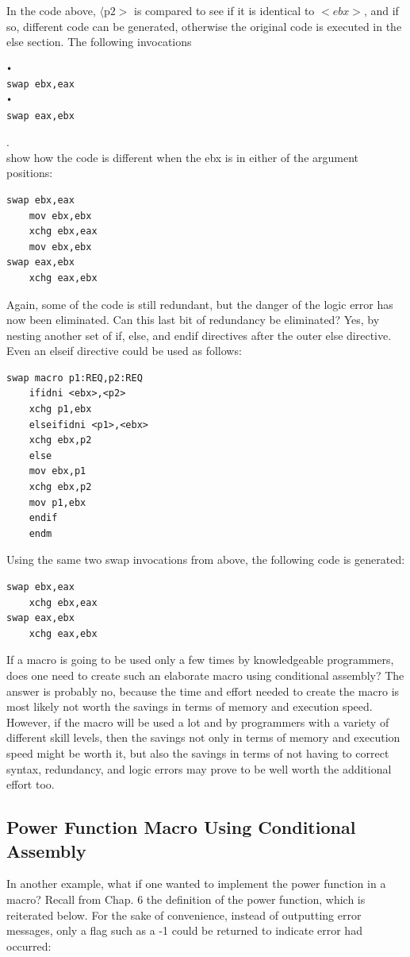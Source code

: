 \documentclass[10pt]{book}
\begin{document}
In the code above, $\langle\mathrm{p} 2>$ is compared to see if it is identical to $<e b x>$, and if so, different code can be generated, otherwise the original code is executed in the else section. The following invocations

\begin{verbatim}
•
swap ebx,eax
•
swap eax,ebx
\end{verbatim}

.\\
show how the code is different when the ebx is in either of the argument positions:

\begin{verbatim}
swap ebx,eax
    mov ebx,ebx
    xchg ebx,eax
    mov ebx,ebx
swap eax,ebx
    xchg eax,ebx
\end{verbatim}

Again, some of the code is still redundant, but the danger of the logic error has now been eliminated. Can this last bit of redundancy be eliminated? Yes, by nesting another set of if, else, and endif directives after the outer else directive. Even an elseif directive could be used as follows:

\begin{verbatim}
swap macro p1:REQ,p2:REQ
    ifidni <ebx>,<p2>
    xchg p1,ebx
    elseifidni <p1>,<ebx>
    xchg ebx,p2
    else
    mov ebx,p1
    xchg ebx,p2
    mov p1,ebx
    endif
    endm
\end{verbatim}

Using the same two swap invocations from above, the following code is generated:

\begin{verbatim}
swap ebx,eax
    xchg ebx,eax
swap eax,ebx
    xchg eax,ebx
\end{verbatim}

If a macro is going to be used only a few times by knowledgeable programmers, does one need to create such an elaborate macro using conditional assembly? The answer is probably no, because the time and effort needed to create the macro is most likely not worth the savings in terms of memory and execution speed. However, if the macro will be used a lot and by programmers with a variety of different skill levels, then the savings not only in terms of memory and execution speed might be worth it, but also the savings in terms of not having to correct syntax, redundancy, and logic errors may prove to be well worth the additional effort too.

\subsection{Power Function Macro Using Conditional Assembly}
In another example, what if one wanted to implement the power function in a macro? Recall from Chap. 6 the definition of the power function, which is reiterated below. For the sake of convenience, instead of outputting error messages, only a flag such as a -1 could be returned to indicate error had occurred:
\end{document}
